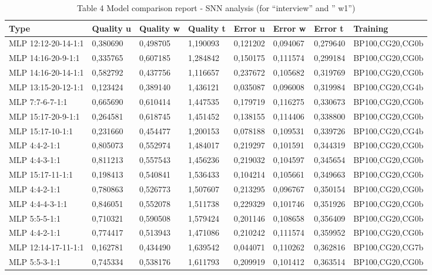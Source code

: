 \documentclass[10pt,oneside]{memoir}
\begin{document}
\begin{table}[htbp]
\begin{minipage}{\linewidth}
\setlength{\tymax}{0.5\linewidth}
\centering
\small
\caption{Table 4 Model comparison report  - SNN analysis  (for ``interview'' and '' w1'')}
\label{table4}
\begin{tabulary}{\linewidth}{@{}l@{}l@{}l@{}l@{}l@{}l@{}l@{}l@{}} \\ \toprule 
Type&Quality u&Quality w&Quality t&Error u&Error w&Error t&Training \\\midrule
MLP 12:12-20-14-1:1&0,380690&0,498705&1,190093&0,121202&0,094067&0,279640&BP100,CG20,CG0b \\
MLP 14:16-20-9-1:1&0,335765&0,607185&1,284842&0,150175&0,111574&0,299184&BP100,CG20,CG0b \\
MLP 14:16-20-14-1:1&0,582792&0,437756&1,116657&0,237672&0,105682&0,319769&BP100,CG20,CG0b \\
MLP 13:15-20-12-1:1&0,123424&0,389140&1,436121&0,035087&0,096008&0,319984&BP100,CG20,CG4b \\
MLP 7:7-6-7-1:1&0,665690&0,610414&1,447535&0,179719&0,116275&0,330673&BP100,CG20,CG0b \\
MLP 15:17-20-9-1:1&0,264581&0,618745&1,451452&0,138155&0,114406&0,338800&BP100,CG20,CG0b \\
MLP 15:17-10-1:1&0,231660&0,454477&1,200153&0,078188&0,109531&0,339726&BP100,CG20,CG4b \\
MLP 4:4-2-1:1&0,805073&0,552974&1,484017&0,219297&0,101591&0,344319&BP100,CG20,CG0b \\
MLP 4:4-3-1:1&0,811213&0,557543&1,456236&0,219032&0,104597&0,345654&BP100,CG20,CG0b \\
MLP 15:17-11-1:1&0,198413&0,540841&1,536433&0,104214&0,105661&0,349663&BP100,CG20,CG0b \\
MLP 4:4-2-1:1&0,780863&0,526773&1,507607&0,213295&0,096767&0,350154&BP100,CG20,CG0b \\
MLP 4:4-4-3-1:1&0,846051&0,552078&1,511738&0,229329&0,101746&0,351926&BP100,CG20,CG0b \\
MLP 5:5-5-1:1&0,710321&0,590508&1,579424&0,201146&0,108658&0,356409&BP100,CG20,CG0b \\
MLP 4:4-2-1:1&0,774417&0,513943&1,471086&0,210242&0,111574&0,359952&BP100,CG20,CG0b \\
MLP 12:14-17-11-1:1&0,162781&0,434490&1,639542&0,044071&0,110262&0,362816&BP100,CG20,CG7b \\
MLP 5:5-3-1:1&0,745334&0,538176&1,611793&0,209919&0,101412&0,363514&BP100,CG20,CG0b \\

\end{tabulary}
\end{minipage}
\end{table}
\end{document}
